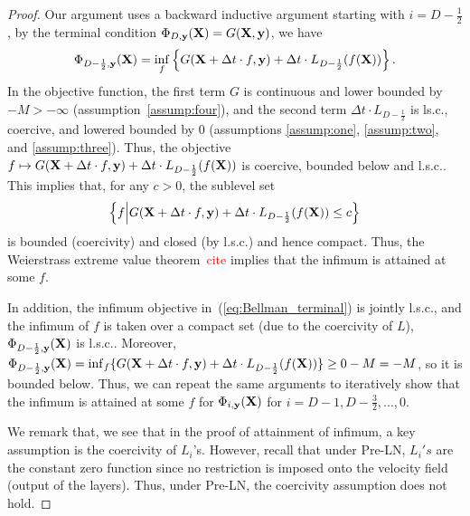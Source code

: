 \documentclass[journal]{IEEEtran}
\def\eqref#1{equation~\ref{#1}}
\newcommand{\bfX}{{\bf X}}
\newcommand{\bfy}{ {\bf y}}
\newcommand{\tr}[1]{\textcolor{red}{#1}}
\renewcommand{\eqref}[1]{(\ref{#1})}
\theoremstyle{plain}
\theoremstyle{definition}
\theoremstyle{remark}
\begin{document}
\begin{proof}
    Our argument uses a backward inductive argument starting with $i=D-\frac{1}{2}$, by the terminal condition $\Phi_{D, \bfy}(\bfX) = G(\bfX, \bfy)$, we have
    \begin{equation}\label{eq:Bellman_terminal}
    {\Phi}_{D-\frac{1}{2}, \bfy}(\bfX) = \inf_{f} \left\{ G(\bfX + \Delta t \cdot f, \bfy) + \Delta t \cdot L_{D-\frac{1}{2}}(f(\bfX)) \right\}.
    \end{equation}
    In the objective function, the first term $G$ is continuous and lower bounded by $-M>-\infty$ (assumption~\ref{assump:four}), and the second term $\Delta t \cdot L_{D-\frac{1}{2}}$ is ls.c., coercive, and lowered bounded by 0 (assumptions \ref{assump:one}, \ref{assump:two}, and \ref{assump:three}). Thus, the objective $ f \mapsto G(\bfX + \Delta t \cdot f, \bfy) + \Delta t \cdot L_{D-\frac{1}{2}}(f(\bfX))$ is coercive, bounded below and l.s.c.. This implies that, for any $c>0$, the sublevel set 
    \[
    \left\{ f\middle| G(\bfX + \Delta t \cdot f, \bfy) + \Delta t \cdot L_{D-\frac{1}{2}}(f(\bfX)) \leq c \right\}
    \]
    is bounded (coercivity) and closed (by l.s.c.) and hence compact. Thus, the Weierstrass extreme value theorem~\tr{cite} implies that the infimum is attained at some $f$. 

    In addition, the infimum objective in~\eqref{eq:Bellman_terminal} is jointly l.s.c., and the infimum of $f$ is taken over a compact set (due to the coercivity of $L$), ${\Phi}_{D-\frac{1}{2}, \bfy}(\bfX)$ is l.s.c.. Moreover, ${\Phi}_{D-\frac{1}{2}, \bfy}(\bfX) = \inf_{f} \{ G(\bfX + \Delta t \cdot f, \bfy) + \Delta t \cdot L_{D-\frac{1}{2}}(f(\bfX)) \} \geq 0-M=-M$, so it is bounded below. Thus, we can repeat the same arguments to iteratively show that the infimum is attained at some $f$ for ${\Phi}_{i, \bfy}(\bfX) $ for $i=D-1, D-\frac{3}{2},...,0$. 

    We remark that, we see that in the proof of attainment of infimum, a key assumption is the coercivity of $L_i$'s. However, recall that under Pre-LN, $L_i's$ are the constant zero function since no restriction is imposed onto the velocity field (output of the layers). Thus, under Pre-LN, the coercivity assumption does not hold.


\end{proof}
\end{document}
